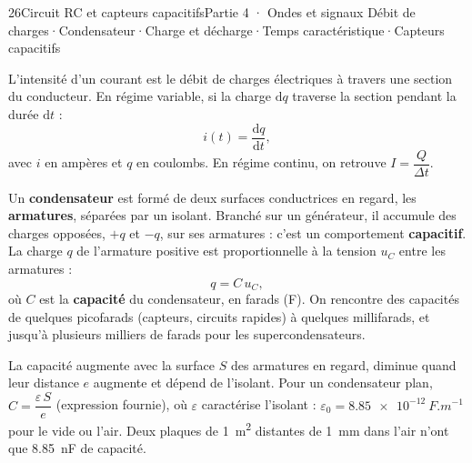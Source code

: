 \begin{ouverture}[rc]{26}{Circuit RC et capteurs capacitifs}{Partie 4 · Ondes et signaux}
{Débit de charges\enspace·\enspace Condensateur\enspace·\enspace Charge et décharge\enspace·\enspace Temps caractéristique\enspace·\enspace Capteurs capacitifs}
\end{ouverture}
\essentiel
{}
\begin{definition}
L'intensité d'un courant est le débit de charges électriques à travers une section du conducteur. En régime variable,
si la charge $\mathrm{d}q$ traverse la section pendant la durée $\mathrm{d}t$ :
\[i(t)=\frac{\mathrm{d}q}{\mathrm{d}t},\]
avec $i$ en ampères et $q$ en coulombs. En régime continu, on retrouve $I=\dfrac{Q}{\Delta t}$.
\end{definition}
\begin{definition}
Un \textbf{condensateur} est formé de deux surfaces conductrices en regard, les \textbf{armatures}, séparées par un isolant.
Branché sur un générateur, il accumule des charges opposées, $+q$ et $-q$, sur ses armatures : c'est un comportement
\textbf{capacitif}. La charge $q$ de l'armature positive est proportionnelle à la tension $u_C$ entre les armatures :
\[q=C\,u_C,\]
où $C$ est la \textbf{capacité} du condensateur, en farads (F). On rencontre des capacités de quelques picofarads (capteurs,
circuits rapides) à quelques millifarads, et jusqu'à plusieurs milliers de farads pour les supercondensateurs.
\end{definition}
\begin{propriete}
La capacité augmente avec la surface $S$ des armatures en regard, diminue quand leur distance $e$ augmente et dépend de
l'isolant. Pour un condensateur plan, $C=\dfrac{\varepsilon\,S}{e}$ (expression fournie), où $\varepsilon$ caractérise l'isolant :
$\varepsilon_0=\qty{8,85e-12}{F.m^{-1}}$ pour le vide ou l'air. Deux plaques de \qty{1}{m^2} distantes de \qty{1}{mm} dans l'air
n'ont que \qty{8,85}{nF} de capacité.
\end{propriete}
